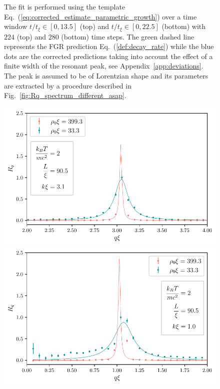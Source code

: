 \documentclass[aps,prd,notitlepage,amsfonts,amssymb,amsmath,nofootinbib,superscriptaddress,longbibliography]{revtex4-2}
\begin{document}
\begin{figure}
{    The fit is performed using the template Eq.~(\ref{eq:corrected_estimate_parametric_growth}) over a time window $t / t_{\xi} \in \left[ 0, 13.5 \right]$ (top) and $t / t_{\xi} \in \left[ 0, 22.5 \right]$ (bottom) with $224$ (top) and $280$ (bottom) time steps. The green dashed line represents the FGR prediction Eq.~(\ref{def:decay_rate}) while the blue dots are the corrected predictions taking into account the effect of a finite width of the resonant peak, see Appendix~\ref{app:deviations}. The peak is assumed to be of Lorentzian shape and its parameters are extracted by a procedure described in Fig.~\ref{fig:Rq_spectrum_different_asap}.
    }
    \label{fig:gamma_k_parametric_amplification_reduction}
\end{figure}

\begin{figure}
    \centering
    \begin{minipage}{0.49\textwidth}
        \centering
        \includegraphics[width=\textwidth]{fig6a.pdf}
    \end{minipage} \hfill
    \begin{minipage}{0.49\textwidth}
        \centering
         \includegraphics[width=\textwidth]{fig6b.pdf}
  

\end{minipage}
\end{figure}
\end{document}
